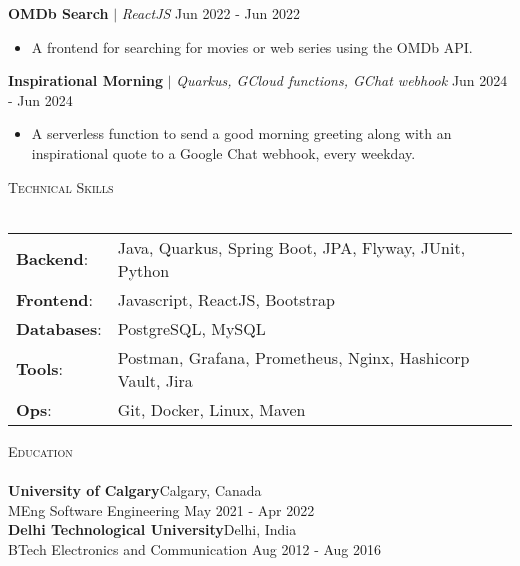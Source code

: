 \documentclass[a4paper]{article}
\newcommand{\lineunder} {
    \vspace*{-8pt} \\
    \hspace*{-18pt} \hrulefill \\
}
\newcommand{\header} [1] {
    \vspace*{5pt}
    {\hspace*{-18pt}\vspace*{6pt} \large\textsc{#1}}
    \vspace*{-6pt} \lineunder
}
\newcommand{\resumeHeadingProject}[3]{
    \vspace{1mm}
    {\textbf{#1}} $|$ \emph{#2} \hfill {#3}
    \vspace{-1.5mm}
}
\newcommand{\resumeItemProject}[1]{
  \item{
    \begin{justify}
    \setlength{\rightskip}{0.15in} {#1 \vspace{-4pt}}
    \end{justify}
  }
}
\begin{document}
\resumeHeadingProject {OMDb Search} {ReactJS} {Jun 2022 - Jun 2022}
\begin{itemize}
    \resumeItemProject {A frontend for searching for movies or web series using the OMDb API.}
\end{itemize}

\resumeHeadingProject {Inspirational Morning} {Quarkus, GCloud functions, GChat webhook} {Jun 2024 - Jun 2024}
\begin{itemize}
    \resumeItemProject {A serverless function to send a good morning greeting along with an inspirational quote to a Google Chat webhook, every weekday.}
\end{itemize}


\header{Technical Skills}

\begin{tabular}{ l l }
    \textbf{Backend}:   & Java, Quarkus, Spring Boot, JPA, Flyway, JUnit, Python                        \\
    \textbf{Frontend}:  & Javascript, ReactJS, Bootstrap                                                \\
    \textbf{Databases}: & PostgreSQL, MySQL                                                             \\
    \textbf{Tools}:     & Postman, Grafana, Prometheus, Nginx, Hashicorp Vault, Jira                    \\
    \textbf{Ops}:       & Git, Docker, Linux, Maven                                                     \\
\end{tabular}
\vspace{2mm}


\header{Education}

\textbf{University of Calgary}\hfill Calgary, Canada\\
MEng Software Engineering \hfill May 2021 - Apr 2022\\
\vspace{2mm}
\textbf{Delhi Technological University}\hfill Delhi, India\\
BTech Electronics and Communication \hfill Aug 2012 - Aug 2016\\
\vspace{2mm}


\
\end{document}

